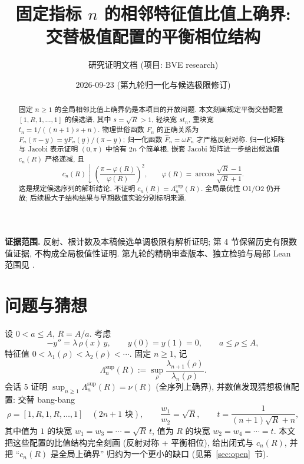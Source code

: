 \documentclass[UTF8]{ctexart}
\title{固定指标 $n$ 的相邻特征值比值上确界: 交替极值配置的平衡相位结构}
\author{研究证明文档 (项目: BVE research)}
\date{2026-09-23 (第九轮归一化与候选极限修订)}
\begin{document}
\maketitle

\begin{abstract}
固定 $n\ge1$ 的全局相邻比值上确界仍是本项目的开放问题.
本文刻画规定平衡交替配置 $[1,R,1,\dots,1]$ 的候选谱, 其中
$s=\sqrt R>1$, 轻块宽 $st_n$, 重块宽 $t_n=1/((n+1)s+n)$.
物理世俗函数 $F_n$ 的正确关系为
$F_n(\pi-y)=yF_n(y)/(\pi-y)$; 归一化函数
$\widehat F_n=\omega F_n$ 才严格反射对称.
归一化矩阵与 Jacobi 表示证明 $(0,\pi)$ 中恰有 $2n$ 个简单根.
嵌套 Jacobi 矩阵进一步给出候选值 $c_n(R)$ 严格递减, 且
\[
 c_n(R)\downarrow\left(\frac{\pi-\varphi(R)}{\varphi(R)}\right)^2,
 \qquad\varphi(R)=\arccos\frac{\sqrt R-1}{\sqrt R+1}.
\]
这是规定候选序列的解析结论, 不证明 $c_n(R)=\Lambda_n^{\sup}(R)$.
全局最优性 O1/O2 仍开放; 后续极大子结构结果与早期数值实验分别标明来源.
\end{abstract}

\medskip
\noindent\textbf{证据范围.} 反射、根计数及本稿候选单调极限有解析证明;
第 4 节保留历史有限数值证据, 不构成全局极值性证明.
第九轮的精确审查版本、独立检验与局部 Lean 范围见
.

\tableofcontents

\section{问题与猜想}

设 $0 < a \leq A$, $R = A/a$. 考虑
\begin{equation}
	-y'' = \lambda\,\rho(x)\,y, \qquad y(0) = y(1) = 0,
	\qquad a \leq \rho \leq A,
\end{equation}
特征值 $0 < \lambda_1(\rho) < \lambda_2(\rho) < \cdots$.
固定 $n \geq 1$, 记
\[
	\Lambda_n^{\sup}(R) := \sup_{\rho} \frac{\lambda_{n+1}(\rho)}{\lambda_n(\rho)}.
\]
会话 5 证明 $\sup_{n \geq 1}\Lambda_n^{\sup}(R) = \nu(R)$ (全序列上确界),
并数值发现猜想极值配置: 交替 bang-bang
\begin{equation}\label{eq:alt}
	\rho = [1, R, 1, R, \dots, 1] \quad (2n+1 \text{ 块}), \qquad
	\frac{w_1}{w_2} = \sqrt R,
	\qquad t = \frac{1}{(n+1)\sqrt R + n},
\end{equation}
其中值为 $1$ 的块宽 $w_1 = w_3 = \cdots = \sqrt R\,t$, 值为 $R$ 的块宽
$w_2 = w_4 = \cdots = t$.
本文把这些配置的比值结构完全刻画 (反射对称 + 平衡相位), 给出闭式与
$c_n(R)$, 并把 ``$c_n(R)$ 是全局上确界'' 归约为一个更小的缺口
(见第~\ref{sec:open}~节).
\end{document}
